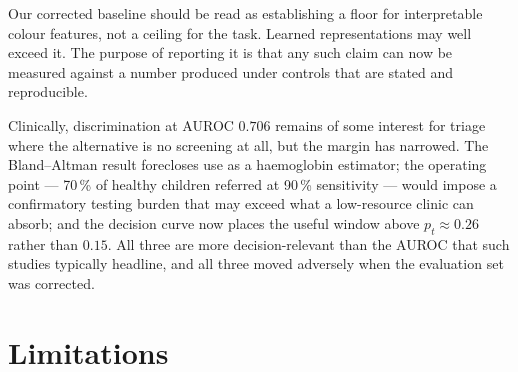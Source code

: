 \documentclass[11pt,a4paper]{article}
\newcommand{\auroc}{AUROC}
\begin{document}
Our corrected baseline should be read as establishing a floor for interpretable colour
features, not a ceiling for the task. Learned representations may well exceed it. The
purpose of reporting it is that any such claim can now be measured against a number produced
under controls that are stated and reproducible.

Clinically, discrimination at \auroc{} $0.706$ remains of some
interest for triage where the alternative is no screening at all, but the margin has narrowed.
The Bland--Altman result forecloses use as a haemoglobin estimator; the operating point ---
70\,\% of healthy children referred at 90\,\% sensitivity --- would impose a confirmatory
testing burden that may exceed what a low-resource clinic can absorb; and the decision curve now
places the useful window above $p_t \approx 0.26$ rather than $0.15$. All three are more
decision-relevant than the \auroc{} that such studies typically headline, and all three moved
adversely when the evaluation set was corrected.

\section{Limitations}
\end{document}

